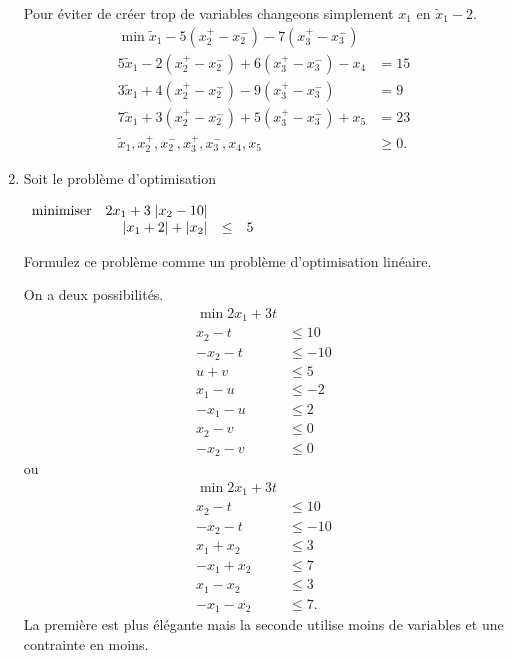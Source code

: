 \begin{enumerate}
    \begin{solution}
      Pour éviter de créer trop de variables changeons simplement $x_1$
      en $\tilde{x}_1 - 2$.
      \begin{align*}
        \min \tilde{x}_{1} - 5(x_{2}^{+} - x_{2}^{-})
        -7(x_{3}^{+} - x_{3}^{-})\\
        5\tilde{x}_{1} - 2(x_{2}^{+} - x_{2}^{-})
        +6(x_{3}^{+} - x_{3}^{-}) - x_{4} & = 15\\
        3\tilde{x}_{1}+4(x_{2}^{+} - x_{2}^{-})
        -9(x_{3}^{+} - x_{3}^{-}) & = 9\\
        7\tilde{x}_{1}+3(x_{2}^{+} - x_{2}^{-})
        +5(x_{3}^{+} - x_{3}^{-}) + x_{5} & = 23\\
        \tilde{x}_{1}, x_{2}^{+}, x_{2}^{-}, x_{3}^{+},
        x_{3}^{-}, x_{4}, x_{5} & \geq 0.
      \end{align*}
    \end{solution}

  \item Soit le problème d'optimisation

    $
    \begin{array}{lrcr}
      \mbox{minimiser}   &  2x_1+3 \; | x_2-10|\\
      & |x_1+2| + |x_2| & \leq & 5
    \end{array}
    $

    Formulez ce problème comme un problème d'optimisation linéaire.

    \begin{solution}
      On a deux possibilités.
      \begin{align*}
        \min 2x_1 + 3t\\
        x_2 - t & \leq 10\\
        -x_2 - t & \leq -10\\
        u + v & \leq 5\\
        x_1 - u & \leq -2\\
        -x_1 - u & \leq 2\\
        x_2 - v & \leq 0\\
        -x_2 - v & \leq 0
      \end{align*}
      ou
      \begin{align*}
        \min 2x_1 + 3t\\
        x_2 - t & \leq 10\\
        -x_2 - t & \leq -10\\
        x_1 + x_2 & \leq 3\\
        -x_1 + x_2 & \leq 7\\
        x_1 - x_2 & \leq 3\\
        -x_1 - x_2 & \leq 7.
      \end{align*}
      La première est plus élégante mais la seconde utilise
      moins de variables et une contrainte en moins.
    \end{solution}



\end{enumerate}
